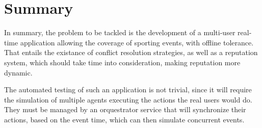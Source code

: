\section{Summary}

In summary, the problem to be tackled is the development of a multi-user real-time application allowing the coverage of sporting events, with offline tolerance. That entails the existance of conflict resolution strategies, as well as a reputation system, which should take time into consideration, making reputation more dynamic.

The automated testing of such an application is not trivial, since it will require the simulation of multiple agents executing the actions the real users would do. They must be managed by an orquestrator service that will synchronize their actions, based on the event time, which can then simulate concurrent events.


